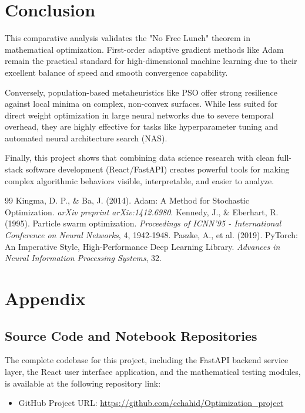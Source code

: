 \documentclass[12pt, a4paper]{article}
\begin{document}
\section{Conclusion}

This comparative analysis validates the "No Free Lunch" theorem in mathematical optimization. First-order adaptive gradient methods like Adam remain the practical standard for high-dimensional machine learning due to their excellent balance of speed and smooth convergence capability. 

Conversely, population-based metaheuristics like PSO offer strong resilience against local minima on complex, non-convex surfaces. While less suited for direct weight optimization in large neural networks due to severe temporal overhead, they are highly effective for tasks like hyperparameter tuning and automated neural architecture search (NAS). 

Finally, this project shows that combining data science research with clean full-stack software development (React/FastAPI) creates powerful tools for making complex algorithmic behaviors visible, interpretable, and easier to analyze.

\newpage
\begin{thebibliography}{99}
 Kingma, D. P., \& Ba, J. (2014). Adam: A Method for Stochastic Optimization. \textit{arXiv preprint arXiv:1412.6980}.
 Kennedy, J., \& Eberhart, R. (1995). Particle swarm optimization. \textit{Proceedings of ICNN'95 - International Conference on Neural Networks}, 4, 1942-1948.
 Paszke, A., et al. (2019). PyTorch: An Imperative Style, High-Performance Deep Learning Library. \textit{Advances in Neural Information Processing Systems}, 32.
\end{thebibliography}

\newpage
\section{Appendix}
\subsection{Source Code and Notebook Repositories}
The complete codebase for this project, including the FastAPI backend service layer, the React user interface application, and the mathematical testing modules, is available at the following repository link:
\begin{itemize}
    \item GitHub Project URL: \url{https://github.com/cchahid/Optimization_project}
\end{itemize}
\end{document}
